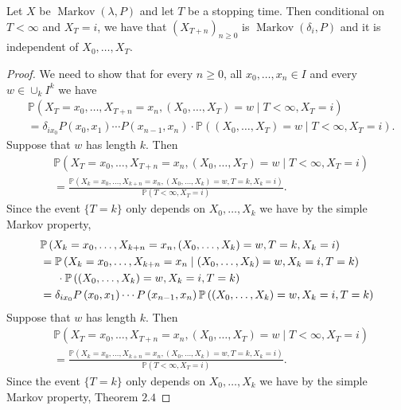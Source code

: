 \documentclass[a4paper]{article}
\begin{document}
\begin{theorem}
    Let $X$ be $\operatorname{Markov}(\lambda, P)$ and let $T$ be a stopping time. Then conditional on $T<\infty$ and $X_T=i$, we have that $\left(X_{T+n}\right)_{n \geq 0}$ is $\operatorname{Markov}\left(\delta_i, P\right)$ and it is independent of $X_0, \ldots, X_T$.
\end{theorem}
\begin{proof}
    We need to show that for every $n \geq 0$, all $x_0, \ldots, x_n \in I$ and every $w \in \cup_k I^k$ we have
    \[
    \begin{aligned}
    &\mathbb{P}\left(X_T=x_0, \ldots, X_{T+n}=x_n,\left(X_0, \ldots, X_T\right)=w \mid T<\infty, X_T=i\right) \\
    &=\delta_{i x_0} P\left(x_0, x_1\right) \cdots P\left(x_{n-1}, x_n\right) \cdot \mathbb{P}\left(\left(X_0, \ldots, X_T\right)=w \mid T<\infty, X_T=i\right) .
    \end{aligned}
    \]
    Suppose that $w$ has length $k$. Then
    \[
    \begin{aligned}
    &\mathbb{P}\left(X_T=x_0, \ldots, X_{T+n}=x_n,\left(X_0, \ldots, X_T\right)=w \mid T<\infty, X_T=i\right) \\
    &=\frac{\mathbb{P}\left(X_k=x_0, \ldots, X_{k+n}=x_n,\left(X_0, \ldots, X_k\right)=w, T=k, X_k=i\right)}{\mathbb{P}\left(T<\infty, X_T=i\right)} .
    \end{aligned}
    \]
    Since the event $\{T=k\}$ only depends on $X_0, \ldots, X_k$ we have by the simple Markov property,
    \[
    \begin{aligned}
    &\mathbb{P}\left(X_k=x_0, \ldots, X_{k+n}=x_n,\left(X_0, \ldots, X_k\right)=w, T=k, X_k=i\right) \\
    &=\mathbb{P}\left(X_k=x_0, \ldots, X_{k+n}=x_n \mid\left(X_0, \ldots, X_k\right)=w, X_k=i, T=k\right)\\ 
    &\hspace{1.5em} \cdot \mathbb{P}\left(\left(X_0, \ldots, X_k\right)=w, X_k=i, T=k\right) \\
    &=\delta_{i x_0} P\left(x_0, x_1\right) \cdots P\left(x_{n-1}, x_n\right) \mathbb{P}\left(\left(X_0, \ldots, X_k\right)=w, X_k=i, T=k\right)
    \end{aligned}
    \]
    Suppose that $w$ has length $k$. Then
    \[
    \begin{aligned}
    &\mathbb{P}\left(X_T=x_0, \ldots, X_{T+n}=x_n,\left(X_0, \ldots, X_T\right)=w \mid T<\infty, X_T=i\right) \\
    &=\frac{\mathbb{P}\left(X_k=x_0, \ldots, X_{k+n}=x_n,\left(X_0, \ldots, X_k\right)=w, T=k, X_k=i\right)}{\mathbb{P}\left(T<\infty, X_T=i\right)} .
    \end{aligned}
    \]
    Since the event $\{T=k\}$ only depends on $X_0, \ldots, X_k$ we have by the simple Markov property, Theorem $2.4$
\end{proof}
\end{document}
